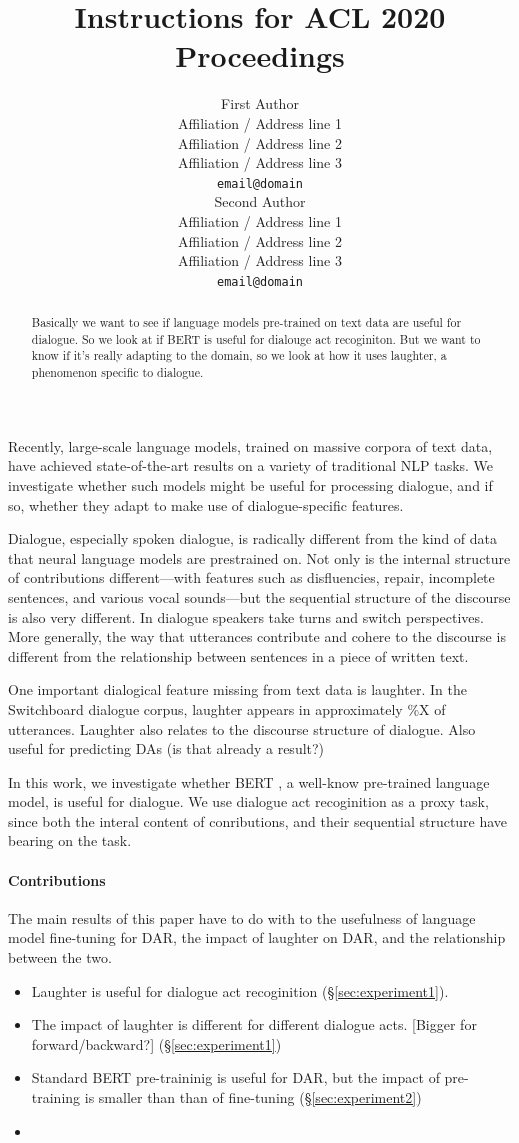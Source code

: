 \documentclass[11pt,a4paper]{article}
\title{Instructions for ACL 2020 Proceedings}
\author{First Author \\
  Affiliation / Address line 1 \\
  Affiliation / Address line 2 \\
  Affiliation / Address line 3 \\
  \texttt{email@domain} \\\And
  Second Author \\
  Affiliation / Address line 1 \\
  Affiliation / Address line 2 \\
  Affiliation / Address line 3 \\
  \texttt{email@domain} \\}
\date{}
\begin{document}
\maketitle
\begin{abstract}
  Basically we want to see if language models pre-trained on text data are useful for dialogue.
  So we look at if BERT is useful for dialouge act recoginiton.
  But we want to know if it's really adapting to the domain, so we look at how it uses laughter, a phenomenon specific to dialogue.
\end{abstract}


Recently, large-scale language models, trained on massive corpora of text data, have achieved state-of-the-art results on a variety of traditional NLP tasks.
We investigate whether such models might be useful for processing dialogue, and if so, whether they adapt to make use of dialogue-specific features.

Dialogue, especially spoken dialogue, is radically different from the kind of data that neural language models are prestrained on.
Not only is the internal structure of contributions different---with features such as disfluencies, repair, incomplete sentences, and various vocal sounds---but the sequential structure of the discourse is also very different.
In dialogue speakers take turns and switch perspectives.
More generally, the way that utterances contribute and cohere to the discourse is different from the relationship between sentences in a piece of written text.

One important dialogical feature missing from text data is laughter.
In the Switchboard dialogue corpus, laughter appears in approximately \%X of utterances.
Laughter also relates to the discourse structure of dialogue. 
Also useful for predicting DAs (is that already a result?)

In this work, we investigate whether BERT \citep{devlinBERTPretrainingDeep2018}, a well-know pre-trained language model, is useful for dialogue.
We use dialogue act recoginition as a proxy task, since both the interal content of conributions, and their sequential structure have bearing on the task.

\paragraph{Contributions}
The main results of this paper have to do with to the usefulness of language model fine-tuning for DAR, 
the impact of laughter on DAR, and the relationship between the two.
\begin{itemize}
  \item Laughter is useful for dialogue act recoginition (\S\ref{sec:experiment1}).
  \item The impact of laughter is different for different dialogue acts. [Bigger for forward/backward?] (\S\ref{sec:experiment1})
  \item Standard BERT pre-traininig is useful for DAR, but the impact of pre-training is smaller than than of fine-tuning (\S\ref{sec:experiment2})
  \item 
\end{itemize}
\end{document}
